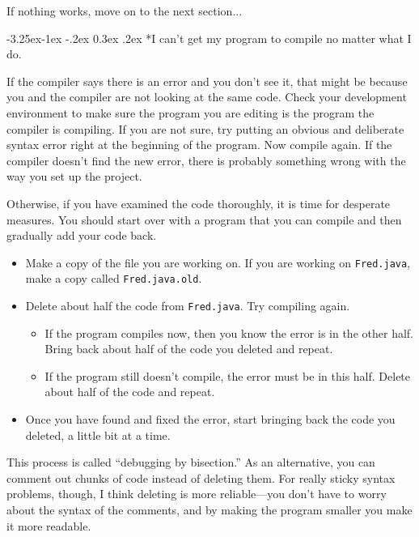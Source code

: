 \documentclass{book}
\makeatletter
\renewcommand\subsection{\@startsection {subsection}{2}{0mm}%
    {-3.25ex\@plus -1ex \@minus -.2ex}%
    {0.3ex \@plus .2ex}%
    {\normalfont\large\bfseries}}
\makeatother
\begin{document}
If nothing works, move on to the next section...


\subsection*{I can't get my program to compile no matter
what I do.}

If the compiler says there is an error and you don't see it, that
might be because you and the compiler are not looking at the same
code.  Check your development environment to make sure the program
you are editing is the program the compiler is compiling.  If you
are not sure, try putting an obvious and deliberate syntax error
right at the beginning of the program.  Now compile again.  If
the compiler doesn't find the new error, there is probably something
wrong with the way you set up the project.

Otherwise, if you have examined the code thoroughly,
it is time for desperate measures.  You should start over with
a program that you can compile and then gradually add your code
back.

\begin{itemize}

\item Make a copy of the file you are working on.  If you are
working on {\tt Fred.java}, make a copy called {\tt Fred.java.old}.

\item Delete about half the code from {\tt Fred.java}.  Try compiling
again.

\begin{itemize}

\item If the program compiles now, then you know the error is in
the other half.  Bring back about half of the code you deleted and
repeat.

\item If the program still doesn't compile, the error must be in
this half.  Delete about half of the code and repeat.

\end{itemize}

\item Once you have found and fixed the error, start bringing back
the code you deleted, a little bit at a time.

\end{itemize}

This process is called ``debugging by bisection.''  As an
alternative, you can comment out chunks of code instead of
deleting them.  For really sticky syntax problems, though,
I think deleting is more reliable---you don't have to worry
about the syntax of the comments, and by making the program
smaller you make it more readable.
\end{document}

